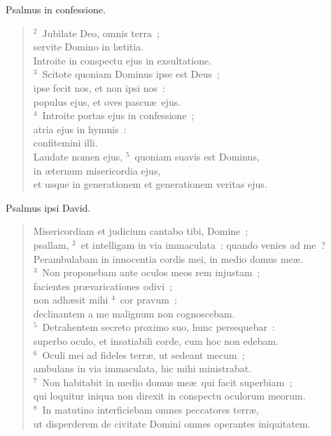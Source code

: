 \bchapter
\lettrine[lines=3,image=true,loversize=0.05,lraise=-0.03]{P}{}salmus in confessione.
\begin{flushleft}\begin{verse}\vspace{6pt}${}^{2}$~Jubilate Deo, omnis terra~;\\ servite Domino in l\ae titia.\\ Introite in conspectu ejus in exsultatione.\\
${}^{3}$~Scitote quoniam Dominus ipse est Deus~;\\ ipse fecit nos, et non ipsi nos~:\\ populus ejus, et oves pascu\ae\ ejus.\\
${}^{4}$~Introite portas ejus in confessione~;\\ atria ejus in hymnis~:\\ confitemini illi.\\ Laudate nomen ejus,
${}^{5}$~quoniam suavis est Dominus,\\ in \ae ternum misericordia ejus,\\ et usque in generationem et generationem veritas ejus.\end{verse}\end{flushleft}



\bchapter
\lettrine[lines=3,image=true,loversize=0.05,lraise=-0.03]{P}{}salmus ipsi David. \begin{flushleft}\begin{verse}\vspace{6pt}Misericordiam et judicium cantabo tibi, Domine~;\\ psallam,
${}^{2}$~et intelligam in via immaculata~: quando venies ad me~?\\ Perambulabam in innocentia cordis mei, in medio domus me\ae .\\
${}^{3}$~Non proponebam ante oculos meos rem injustam~;\\ facientes pr\ae varicationes odivi~;\\ non adh\ae sit mihi
${}^{4}$~cor pravum~;\\ declinantem a me malignum non cognoscebam.\\
${}^{5}$~Detrahentem secreto proximo suo, hunc persequebar~:\\ superbo oculo, et insatiabili corde, cum hoc non edebam.\\
${}^{6}$~Oculi mei ad fideles terr\ae , ut sedeant mecum~;\\ ambulans in via immaculata, hic mihi ministrabat.\\
${}^{7}$~Non habitabit in medio domus me\ae\ qui facit superbiam~;\\ qui loquitur iniqua non direxit in conspectu oculorum meorum.\\
${}^{8}$~In matutino interficiebam omnes peccatores terr\ae ,\\ ut disperderem de civitate Domini omnes operantes iniquitatem.\end{verse}\end{flushleft}



